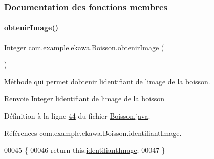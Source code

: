 \subsubsection{Documentation des fonctions membres}
\mbox{\label{classcom_1_1example_1_1ekawa_1_1_boisson_a6edf9114dd70c1c16382136e57e6d345}} 
\paragraph{\texorpdfstring{obtenir\+Image()}{obtenirImage()}}
{\footnotesize\ttfamily Integer com.\+example.\+ekawa.\+Boisson.\+obtenir\+Image (\begin{DoxyParamCaption}{ }\end{DoxyParamCaption})}



Méthode qui permet d\textquotesingle{}obtenir l\textquotesingle{}identifiant de l\textquotesingle{}image de la boisson. 

\begin{DoxyReturn}{Renvoie}
Integer l\textquotesingle{}identifiant de l\textquotesingle{}image de la boisson 
\end{DoxyReturn}


Définition à la ligne \hyperlink{_boisson_8java_source_l00044}{44} du fichier \hyperlink{_boisson_8java_source}{Boisson.\+java}.



Références \hyperlink{_boisson_8java_source_l00018}{com.\+example.\+ekawa.\+Boisson.\+identifiant\+Image}.


\begin{DoxyCode}
00045     \{
00046         \textcolor{keywordflow}{return} this.\hyperlink{classcom_1_1example_1_1ekawa_1_1_boisson_ac73d259d39e459b00e5cfdf73a2aaf98}{identifiantImage};
00047     \}
\end{DoxyCode}
\mbox{\label{classcom_1_1example_1_1ekawa_1_1_boisson_a410781851622f3c4b87a30d7381f9082}} 
